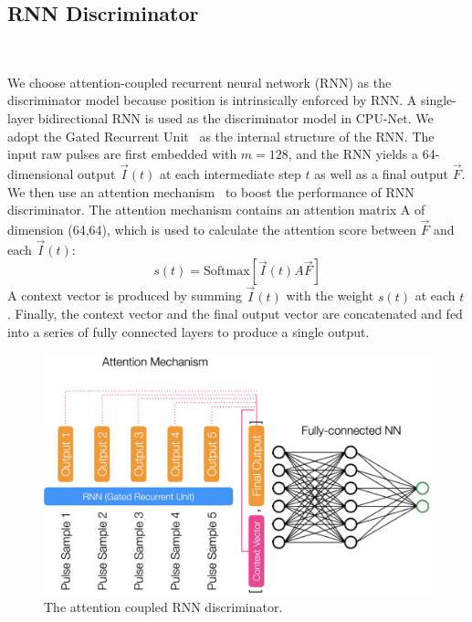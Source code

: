 \subsection{RNN Discriminator}~\label{subapp:RNN}

We choose attention-coupled recurrent neural network (RNN)\cite{attention} as the discriminator model because position is intrinsically enforced by RNN. A single-layer bidirectional RNN is used as the discriminator model in CPU-Net. We adopt the Gated Recurrent Unit~\cite{GRU} as the internal structure of the RNN. The input raw pulses are first embedded with $m=128$, and the RNN yields a 64-dimensional output $\vec{I}(t)$ at each intermediate step $t$ as well as a final output  $\vec{F}$. We then use an attention mechanism~\cite{attention} to boost the performance of RNN discriminator. The attention mechanism contains an attention matrix A of dimension (64,64), which is used to calculate the attention score between $\vec{F}$ and each $\vec{I}(t)$:
\begin{equation}
    s(t) = \mathrm{Softmax}[\vec{I}(t) A \vec{F}]
\end{equation}
A context vector is produced by summing $\vec{I}(t)$ with the weight $s(t)$ at each $t$. Finally, the context vector and the final output vector are concatenated and fed into a series of fully connected layers to produce a single output. 

\begin{figure}[htb!]
    \centering

    \includegraphics[width=0.7\linewidth,trim={0pc 0pc 0pc 0pc},clip]{ch5/figs/rnnAttention.png}
    \caption{The attention coupled RNN discriminator.}
    \label{fig:detail_network}
\end{figure}




